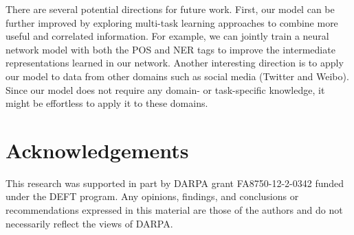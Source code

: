 \documentclass[11pt]{article}
\begin{document}
There are several potential directions for future work. First, our model can be further improved by exploring multi-task learning approaches to combine more useful and correlated information. For example, we can jointly train a neural network model with both the POS and NER tags to improve the intermediate representations learned in our network. Another interesting direction is to apply our model to data from other domains such as social media (Twitter and Weibo). Since our model does not require any domain- or task-specific knowledge, it might be effortless to apply it to these domains.

\section*{Acknowledgements}
This research was supported in part by DARPA grant FA8750-12-2-0342 funded under the DEFT program. 
Any opinions, findings, and conclusions or recommendations expressed in this material are those of the authors and do not necessarily reflect the views of DARPA.



\end{document}
